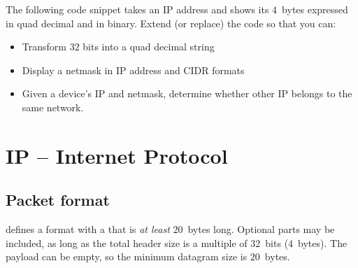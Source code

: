 \begin{exercise}
The following code snippet takes an IP address and shows its $4$~bytes expressed in 
quad decimal and in binary.
Extend (or replace) the code so that you can:
\begin{itemize}
\item Transform $32$ bits into a quad decimal string
\item Display a netmask in IP address and CIDR formats
\item Given a device's IP and netmask, determine whether other IP belongs to the same network.
\end{itemize}
\begin{center}
\end{center}
\end{exercise}




% 







\section{IP -- Internet Protocol}

\subsection*{Packet format}

 defines a  format with a  
that is \textit{at least} $20$~bytes long. Optional parts may be included,
as long as the total header size is a multiple of $32$~bits ($4$~bytes).
The payload can be empty, so the minimum datagram size is $20$~bytes.\\

